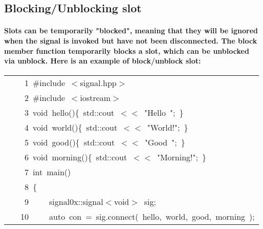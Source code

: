 \documentclass[9pt,onside,a4paper]{article}
\newcommand{\hlstd}[1]{\textcolor[rgb]{0.2,0,0.4}{#1}}
\newcommand{\hlstr}[1]{\textcolor[rgb]{0.09,0.38,0.65}{#1}}
\newcommand{\hlppc}[1]{\textcolor[rgb]{0.33,0.45,0.69}{#1}}
\newcommand{\hlopt}[1]{\textcolor[rgb]{0.33,0.33,0.33}{#1}}
\newcommand{\hllin}[1]{\textcolor[rgb]{0.6,0.6,0.6}{#1}}
\newcommand{\hlkwb}[1]{\textcolor[rgb]{0.96,0.55,0.14}{#1}}
\newcommand{\hlkwc}[1]{\textcolor[rgb]{0,0,1}{#1}}
\newcommand{\hlkwd}[1]{\textcolor[rgb]{0.82,0.11,0.93}{#1}}
\begin{document}
\subsection{Blocking/Unblocking slot}
\paragraph{Slots can be temporarily "blocked", meaning that they will be ignored when the signal is invoked but have not been
    disconnected. The block member function temporarily blocks a slot, which can be unblocked via unblock. Here is an example of
    block/unblock slot: }

\ttfamily
\begin{center}
\begin{xtabular}{||l||}
\hline
\hlstd{}\hllin{\ \ \ \ 1\ }\hlppc{\#include\ $<$signal.hpp$>$}\\
\hllin{\ \ \ \ 2\ }\hlstd{}\hlppc{\#include\ $<$iostream$>$}\\
\hllin{\ \ \ \ 3\ }\hlstd{}\hlkwb{void\ }\hlstd{}\hlkwd{hello}\hlstd{}\hlopt{()\{\ }\hlstd{std}\hlopt{::}\hlstd{cout\ }\hlopt{$<$$<$\ }\hlstd{}\hlstr{"Hello\ "}\hlstd{}\hlopt{;\ \}}\\
\hllin{\ \ \ \ 4\ }\hlstd{}\hlkwb{void\ }\hlstd{}\hlkwd{world}\hlstd{}\hlopt{()\{\ }\hlstd{std}\hlopt{::}\hlstd{cout\ }\hlopt{$<$$<$\ }\hlstd{}\hlstr{"World!"}\hlstd{}\hlopt{;\ \}}\\
\hllin{\ \ \ \ 5\ }\hlstd{}\hlkwb{void\ }\hlstd{}\hlkwd{good}\hlstd{}\hlopt{()\{\ }\hlstd{std}\hlopt{::}\hlstd{cout\ }\hlopt{$<$$<$\ }\hlstd{}\hlstr{"Good\ "}\hlstd{}\hlopt{;\ \}}\\
\hllin{\ \ \ \ 6\ }\hlstd{}\hlkwb{void\ }\hlstd{}\hlkwd{morning}\hlstd{}\hlopt{()\{\ }\hlstd{std}\hlopt{::}\hlstd{cout\ }\hlopt{$<$$<$\ }\hlstd{}\hlstr{"Morning!"}\hlstd{}\hlopt{;\ \}}\\
\hllin{\ \ \ \ 7\ }\hlstd{}\hlkwb{int\ }\hlstd{}\hlkwd{main}\hlstd{}\hlopt{()}\\
\hllin{\ \ \ \ 8\ }\hlstd{}\hlopt{\{}\\
\hllin{\ \ \ \ 9\ }\hlstd{}\hlstd{\ \ \ \ }\hlstd{signal0x}\hlopt{::}\hlstd{signal}\hlopt{$<$}\hlstd{}\hlkwb{void}\hlstd{}\hlopt{$>$\ }\hlstd{sig}\hlopt{;}\\
\hllin{\ \ \ 10\ }\hlstd{}\hlstd{\ \ \ \ }\hlstd{}\hlkwc{auto\ }\hlstd{con\ }\hlopt{=\ }\hlstd{sig}\hlopt{.}\hlstd{}\hlkwd{connect}\hlstd{}\hlopt{(\ }\hlstd{hello}\hlopt{,\ }\hlstd{world}\hlopt{,\ }\hlstd{good}\hlopt{,\ }\hlstd{morning\ }\hlopt{);}\\

\end{xtabular}
\end{center}
\end{document}
